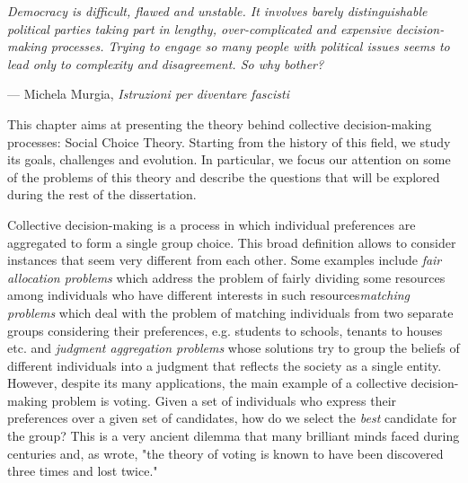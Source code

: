 \setlength{}
\setlength\epigraphrule{0pt}
\renewcommand{\textflush}{flushepinormal}
\epigraph{\itshape Democracy is difficult, flawed and unstable. It involves barely distinguishable political parties taking part in lengthy, over-complicated and expensive decision-making processes. Trying to engage so many people with political issues seems to lead only to complexity and disagreement. So why bother?}{--- Michela Murgia, \textit{Istruzioni per diventare fascisti}}

This chapter aims at presenting the theory behind collective decision-making processes: Social Choice Theory. Starting from the history of this field, we study its goals, challenges and evolution. In particular, we focus our attention on some of the problems of this theory and describe the questions that will be explored during the rest of the dissertation.

Collective decision-making is a process in which individual preferences are aggregated to form a single group choice. This broad definition allows to consider instances that seem very different from each other. Some examples include \textit{fair allocation problems} \textemdash which address the problem of fairly dividing some resources among individuals who have different interests in such resources\textemdash \textit{matching problems} \textemdash which deal with the problem of matching individuals from two separate groups considering their preferences, e.g. students to schools, tenants to houses etc. \textemdash and \textit{judgment aggregation problems} \textemdash whose solutions try to group the beliefs of different individuals into a judgment that reflects the society as a single entity. However, despite its many applications, the main example of a collective decision-making problem is voting. 
Given a set of individuals who express their preferences over a given set of candidates, how do we select the \textit{best} candidate for the group? This is a very ancient dilemma that many brilliant minds faced during centuries and, as \citet{McLean1990} wrote, "the theory of voting is known to have been discovered three times and lost twice."

